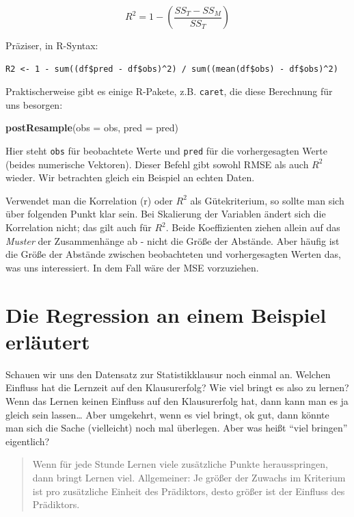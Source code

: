 \documentclass[12pt,ngerman,]{book}
\makeatletter
\newenvironment{Shaded}{\begin{snugshade}}{\end{snugshade}}
\newcommand{\KeywordTok}[1]{\textcolor[rgb]{0.13,0.29,0.53}{\textbf{#1}}}
\newcommand{\DataTypeTok}[1]{\textcolor[rgb]{0.13,0.29,0.53}{#1}}
\newcommand{\NormalTok}[1]{#1}
\newenvironment{kframe}{%
\medskip{}
\setlength{\fboxsep}{.8em}
 \def\at@end@of@kframe{}%
 \ifinner\ifhmode%
  \def\at@end@of@kframe{\end{minipage}}%
  \begin{minipage}{\columnwidth}%
 \fi\fi%
 \def\FrameCommand##1{\hskip\@totalleftmargin \hskip-\fboxsep
 \colorbox{shadecolor}{##1}\hskip-\fboxsep
     \hskip-\linewidth \hskip-\@totalleftmargin \hskip\columnwidth}%
 \MakeFramed {\advance\hsize-\width
   \@totalleftmargin\z@ \linewidth\hsize
   \@setminipage}}%
 {\par\unskip\endMakeFramed%
 \at@end@of@kframe}
\renewenvironment{Shaded}{\begin{kframe}}{\end{kframe}}
\theoremstyle{definition}
\theoremstyle{definition}
\theoremstyle{remark}
\let\BeginKnitrBlock\begin \let\EndKnitrBlock\end
\makeatother
\begin{document}
\[ R^2 = 1 - \left( \frac{SS_T - SS_M}{SS_T} \right)\]

Präziser, in R-Syntax:

\begin{verbatim}
R2 <- 1 - sum((df$pred - df$obs)^2) / sum((mean(df$obs) - df$obs)^2)
\end{verbatim}

Praktischerweise gibt es einige R-Pakete, z.B. \texttt{caret}, die diese
Berechnung für uns besorgen:

\begin{Shaded}
\begin{Highlighting}[]
\KeywordTok{postResample}\NormalTok{(}\DataTypeTok{obs =}\NormalTok{ obs, }\DataTypeTok{pred =}\NormalTok{ pred)}
\end{Highlighting}
\end{Shaded}

Hier steht \texttt{obs} für beobachtete Werte und \texttt{pred} für die
vorhergesagten Werte (beides numerische Vektoren). Dieser Befehl gibt
sowohl RMSE als auch \(R^2\) wieder. Wir betrachten gleich ein Beispiel
an echten Daten.

\BeginKnitrBlock{rmdcaution}
Verwendet man die Korrelation (r) oder \(R^2\) als Gütekriterium, so
sollte man sich über folgenden Punkt klar sein. Bei Skalierung der
Variablen ändert sich die Korrelation nicht; das gilt auch für \(R^2\).
Beide Koeffizienten ziehen allein auf das \emph{Muster} der
Zusammenhänge ab - nicht die Größe der Abstände. Aber häufig ist die
Größe der Abstände zwischen beobachteten und vorhergesagten Werten das,
was uns interessiert. In dem Fall wäre der MSE vorzuziehen.
\EndKnitrBlock{rmdcaution}

\section{Die Regression an einem Beispiel
erläutert}\label{die-regression-an-einem-beispiel-erlautert}

Schauen wir uns den Datensatz zur Statistikklausur noch einmal an.
Welchen Einfluss hat die Lernzeit auf den Klausurerfolg? Wie viel bringt
es also zu lernen? Wenn das Lernen keinen Einfluss auf den Klausurerfolg
hat, dann kann man es ja gleich sein lassen\ldots{} Aber umgekehrt, wenn
es viel bringt, ok gut, dann könnte man sich die Sache (vielleicht) noch
mal überlegen. Aber was heißt ``viel bringen'' eigentlich?

\begin{quote}
Wenn für jede Stunde Lernen viele zusätzliche Punkte herausspringen,
dann bringt Lernen viel. Allgemeiner: Je größer der Zuwachs im Kriterium
ist pro zusätzliche Einheit des Prädiktors, desto größer ist der
Einfluss des Prädiktors.
\end{quote}
\end{document}
